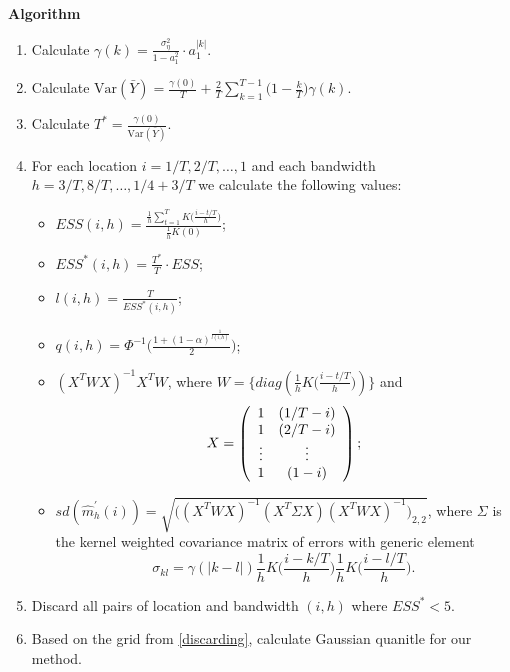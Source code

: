 \documentclass[12pt,a4paper]{letter}
\newcommand{\Var}{\mathrm{Var}}
\begin{document}
\pagestyle{empty}

\textbf{Algorithm}

\begin{enumerate}
	\item Calculate $\gamma(k) = \frac{\sigma_\eta^2 }{1 - a_1^2}\cdot a_1^{|k|}$.
	\item Calculate $\Var(\bar{Y}) = \frac{\gamma(0)}{T} + \frac{2}{T} \sum_{k = 1}^{T-1} \big(1 - \frac{k}{T}\big)\gamma(k)$.
	\item Calculate $T^* = \frac{\gamma(0)}{\Var(\bar{Y})}$.
	\item For each location $i = 1/T, 2/T, \ldots, 1$ and each bandwidth $h = 3/T, 8/T,\ldots, 1/4 + 3/T$ we calculate the following values:
	\begin{itemize}
		\item $ESS(i, h) = \frac{\frac{1}{h}\sum_{t =1}^T K\big(\frac{i - t/T}{h}\big)}{\frac{1}{h}K(0)}$;
		\item $ESS^*(i, h) =\frac{T^*}{T} \cdot ESS$;
		\item $l(i, h) = \frac{T}{ESS^*(i, h)}$;
		\item $q(i, h) = \Phi^{-1} \Big(\frac{1 + (1 - \alpha)^{\frac{1}{l(i, h)}}}{2}\Big)$;
		\item $(X^T W X)^{-1} X^T W$, where $W = \{diag(\frac{1}{h} K\big(\frac{i - t/T}{h}\big))\}$ and 
			\begin{equation}
			X =  \left( \begin{array}{c c}
   					1 & (1/T - i) \\
					1 & (2/T - i)  \\
					\vdots & \vdots \\
					1 & (1 - i)  \\
				   \end{array} \right); \nonumber
			\end{equation}
		\item $sd(\widehat{m}^\prime_h(i)) = \sqrt{\big((X^T W X)^{-1} (X^T \Sigma X) (X^T W X)^{-1}\big)_{2, 2}}$, where $\Sigma$ is the kernel weighted covariance matrix of errors with generic element $$\sigma_{kl} = \gamma(|k - l|) \frac{1}{h} K\Big(\frac{i - k/T}{h}\Big) \frac{1}{h}  K\Big(\frac{i - l/T}{h}\Big).$$
	\end{itemize}
	\item\label{discarding} Discard all pairs of location and bandwidth $(i, h)$ where $ESS^* < 5$.
	\item Based on the grid from \ref{discarding}, calculate Gaussian quanitle for our method.
	

\end{enumerate}
\end{document}
